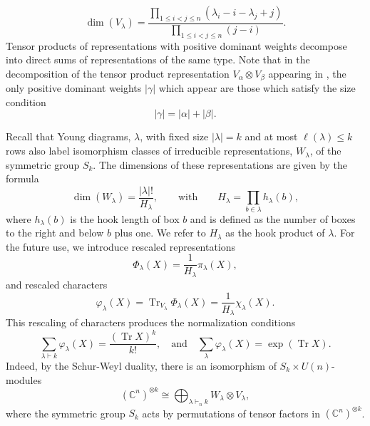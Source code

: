\documentclass[pdflatex, sn-mathphys-num]{sn-jnl} %
\theoremstyle{plain}
\theoremstyle{definition}
\let\cref\crtcref
\DeclareMathOperator{\Tr}{Tr}
\newcommand{\ot}{\otimes} %
\newcommand{\vp}{\varphi} %
\newcommand{\ya}{\alpha}
\newcommand{\yb}{\beta}
\newcommand{\yc}{\gamma}
\newcommand{\yx}{\lambda}
\newcommand{\sya}{|\ya|}
\newcommand{\syb}{|\yb|}
\newcommand{\syc}{|\yc|}
\newcommand{\syx}{|\yx|}
\begin{document}
\begin{equation}
    \label{eq:weyl_dim}
    \dim(V_{\yx}) = \frac{\prod_{1 \leq i<j \leq n}(\yx_i - i - \yx_j + j)}{\prod_{1 \leq i<j \leq n}(j-i)}.
\end{equation}
Tensor products of representations with positive dominant weights decompose into direct sums of representations of the same type.
Note that in the decomposition of the tensor product representation $V_{\ya}\ot V_{\yb}$ appearing in \cref{eq:tensor_product}, the only positive dominant weights $\syc$ which appear are those which satisfy the size condition
\begin{equation}
    \label{eq:size_condition_tri}
    \syc = \sya + \syb.
\end{equation}

Recall that Young diagrams, $\yx$, with fixed size $\syx=k$ and at most $\ell(\yx) \leq k$ rows also label isomorphism classes of irreducible representations, $W_\yx$, of the symmetric group $S_k$.
The dimensions of these representations are given by the formula
\begin{equation}
    \label{eq:dim_W_hook_product}
    \dim(W_\yx) = \frac{\syx!}{H_{\yx}},
    \qquad
    \text{with}
    \qquad
    H_{\yx} = \prod_{b \in \yx} h_\yx(b),
\end{equation}
where $h_\yx(b)$ is the hook length of box $b$ and is defined as the number of boxes to the right and below $b$ plus one.
We refer to $H_{\yx}$ as the hook product of $\yx$.
For the future use, we introduce rescaled representations
\begin{equation}
    \Phi_\yx(X) = \frac{1}{H_{\yx}} \pi_\yx(X),
\end{equation}
and rescaled characters
\begin{equation}
    \vp_\yx(X) = \Tr_{V_\yx}  \Phi_\yx(X) = \frac{1}{H_{\yx}}  \chi_\yx(X).
\end{equation}
This rescaling of characters produces the normalization conditions
\begin{equation}
    \label{eq:varphi_normalization}
    \sum_{\yx \vdash k} \vp_\yx(X) = \frac{(\Tr X)^k}{k!},
    \quad \text{and} \quad
    \sum_\yx \vp_\yx(X) = \exp(\Tr X).
\end{equation}
Indeed, by the Schur-Weyl duality, there is an isomorphism of $S_k \times U(n)$-modules
\begin{equation}
    \label{eq:schur-weyl}
    (\mathbb{C}^n)^{\ot k} \cong \bigoplus_{\yx \vdash_{n} k} W_\yx \ot V_\yx,
\end{equation}
where the symmetric group $S_k$ acts by permutations of tensor factors in $(\mathbb{C}^n)^{\ot k}$.
\end{document}
